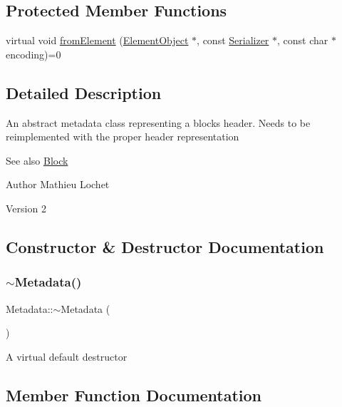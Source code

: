 \subsection*{Protected Member Functions}
\begin{DoxyCompactItemize}
\item 
virtual void \mbox{\hyperlink{classComponent_a2ded18881226d0077dc393e0e9304bb1}{from\+Element}} (\mbox{\hyperlink{classElementObject}{Element\+Object}} $\ast$, const \mbox{\hyperlink{classSerializer}{Serializer}} $\ast$, const char $\ast$encoding)=0
\end{DoxyCompactItemize}


\subsection{Detailed Description}
An abstract metadata class representing a block\textquotesingle{}s header. Needs to be reimplemented with the proper header representation \begin{DoxySeeAlso}{See also}
\mbox{\hyperlink{classBlock}{Block}}
\end{DoxySeeAlso}
\begin{DoxyAuthor}{Author}
Mathieu Lochet 
\end{DoxyAuthor}
\begin{DoxyVersion}{Version}
2 
\end{DoxyVersion}


\subsection{Constructor \& Destructor Documentation}
\mbox{\label{classMetadata_a29845232ba882e6dba16311f2ae4c374}} 
\subsubsection{\texorpdfstring{$\sim$\+Metadata()}{~Metadata()}}
{\footnotesize\ttfamily Metadata\+::$\sim$\+Metadata (\begin{DoxyParamCaption}{ }\end{DoxyParamCaption})\hspace{0.3cm}{\ttfamily [virtual]}}

A virtual default destructor 

\subsection{Member Function Documentation}
\mbox{\label{classComponent_a28212595f8ee85fe009bd233bc99b2fc}} 
